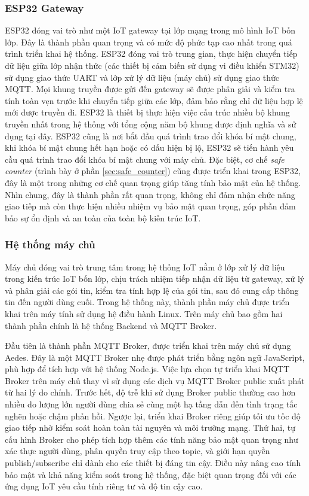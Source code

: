\subsubsection{ESP32 Gateway}
ESP32 đóng vai trò như một IoT gateway tại lớp mạng trong mô hình IoT bốn lớp. Đây là thành phần quan trọng và có mức độ phức tạp cao nhất trong quá trình triển khai hệ thống. ESP32 đóng vai trò trung gian, thực hiện chuyển tiếp dữ liệu giữa lớp nhận thức (các thiết bị cảm biến sử dụng vi điều khiển STM32) sử dụng giao thức UART và lớp xử lý dữ liệu (máy chủ) sử dụng giao thức MQTT. Mọi khung truyền được gửi đến gateway sẽ được phân giải và kiểm tra tính toàn vẹn trước khi chuyển tiếp giữa các lớp, đảm bảo rằng chỉ dữ liệu hợp lệ mới được truyền đi. ESP32 là thiết bị thực hiện việc cấu trúc nhiều bộ khung truyền nhất trong hệ thống với tổng cộng năm bộ khung được định nghĩa và sử dụng tại đây. ESP32 cũng là nơi bắt đầu quá trình trao đổi khóa bí mật chung, khi khóa bí mật chung hết hạn hoặc có dấu hiện bị lộ, ESP32 sẽ tiến hành yêu cầu quá trình trao đổi khóa bí mật chung với máy chủ. Đặc biệt, cơ chế \textit{safe counter} (trình bày ở phần \ref{sec:safe_counter}) cũng được triển khai trong ESP32, đây là một trong những cơ chế quan trọng giúp tăng tính bảo mật của hệ thống. Nhìn chung, đây là thành phần rất quan trọng, không chỉ đảm nhận chức năng giao tiếp mà còn thực hiện nhiều nhiệm vụ bảo mật quan trọng, góp phần đảm bảo sự ổn định và an toàn của toàn bộ kiến trúc IoT.

\subsubsection{Hệ thống máy chủ}
Máy chủ đóng vai trò trung tâm trong hệ thống IoT nằm ở lớp xử lý dữ liệu trong kiến trúc IoT bốn lớp, chịu trách nhiệm tiếp nhận dữ liệu từ gateway, xử lý và phân giải các gói tin, kiểm tra tính hợp lệ của gói tin, sau đó cung cấp thông tin đến người dùng cuối. Trong hệ thống này, thành phần máy chủ được triển khai trên máy tính sử dụng hệ điều hành Linux. Trên máy chủ bao gồm hai thành phần chính là hệ thống Backend và MQTT Broker. 

Đầu tiên là thành phần MQTT Broker, được triển khai trên máy chủ sử dụng Aedes. Đây là một MQTT Broker nhẹ được phát triển bằng ngôn ngữ JavaScript, phù hợp để tích hợp với hệ thống Node.js. Việc lựa chọn tự triển khai MQTT Broker trên máy chủ thay vì sử dụng các dịch vụ MQTT Broker public xuất phát từ hai lý do chính. Trước hết, độ trễ khi sử dụng Broker public thường cao hơn nhiều do lượng lớn người dùng chia sẻ cùng một hạ tầng dẫn đến tình trạng tắc nghẽn hoặc chậm phản hồi. Ngược lại, triển khai Broker riêng giúp tối ưu tốc độ giao tiếp nhờ kiểm soát hoàn toàn tài nguyên và môi trường mạng. Thứ hai, tự cấu hình Broker cho phép tích hợp thêm các tính năng bảo mật quan trọng như xác thực người dùng, phân quyền truy cập theo topic, và giới hạn quyền publish/subscribe chỉ dành cho các thiết bị đáng tin cậy. Điều này nâng cao tính bảo mật và khả năng kiểm soát trong hệ thống, đặc biệt quan trọng đối với các ứng dụng IoT yêu cầu tính riêng tư và độ tin cậy cao. 

